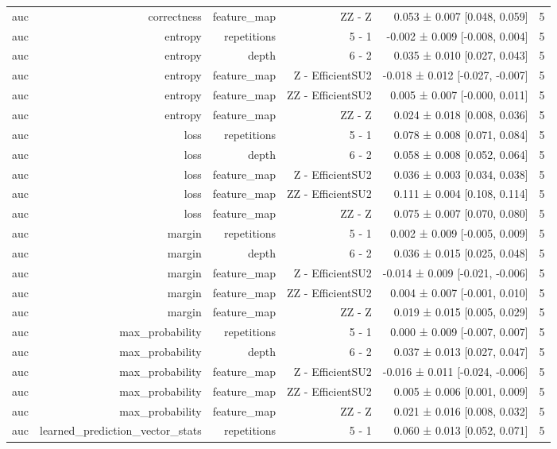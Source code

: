 \begin{table}
\begin{tabular}{lrrrrr}
auc & correctness & feature\_map & ZZ - Z & 0.053 ± 0.007 [0.048, 0.059] & 5 \\
auc & entropy & repetitions & 5 - 1 & -0.002 ± 0.009 [-0.008, 0.004] & 5 \\
auc & entropy & depth & 6 - 2 & 0.035 ± 0.010 [0.027, 0.043] & 5 \\
auc & entropy & feature\_map & Z - EfficientSU2 & -0.018 ± 0.012 [-0.027, -0.007] & 5 \\
auc & entropy & feature\_map & ZZ - EfficientSU2 & 0.005 ± 0.007 [-0.000, 0.011] & 5 \\
auc & entropy & feature\_map & ZZ - Z & 0.024 ± 0.018 [0.008, 0.036] & 5 \\
auc & loss & repetitions & 5 - 1 & 0.078 ± 0.008 [0.071, 0.084] & 5 \\
auc & loss & depth & 6 - 2 & 0.058 ± 0.008 [0.052, 0.064] & 5 \\
auc & loss & feature\_map & Z - EfficientSU2 & 0.036 ± 0.003 [0.034, 0.038] & 5 \\
auc & loss & feature\_map & ZZ - EfficientSU2 & 0.111 ± 0.004 [0.108, 0.114] & 5 \\
auc & loss & feature\_map & ZZ - Z & 0.075 ± 0.007 [0.070, 0.080] & 5 \\
auc & margin & repetitions & 5 - 1 & 0.002 ± 0.009 [-0.005, 0.009] & 5 \\
auc & margin & depth & 6 - 2 & 0.036 ± 0.015 [0.025, 0.048] & 5 \\
auc & margin & feature\_map & Z - EfficientSU2 & -0.014 ± 0.009 [-0.021, -0.006] & 5 \\
auc & margin & feature\_map & ZZ - EfficientSU2 & 0.004 ± 0.007 [-0.001, 0.010] & 5 \\
auc & margin & feature\_map & ZZ - Z & 0.019 ± 0.015 [0.005, 0.029] & 5 \\
auc & max\_probability & repetitions & 5 - 1 & 0.000 ± 0.009 [-0.007, 0.007] & 5 \\
auc & max\_probability & depth & 6 - 2 & 0.037 ± 0.013 [0.027, 0.047] & 5 \\
auc & max\_probability & feature\_map & Z - EfficientSU2 & -0.016 ± 0.011 [-0.024, -0.006] & 5 \\
auc & max\_probability & feature\_map & ZZ - EfficientSU2 & 0.005 ± 0.006 [0.001, 0.009] & 5 \\
auc & max\_probability & feature\_map & ZZ - Z & 0.021 ± 0.016 [0.008, 0.032] & 5 \\
auc & learned\_prediction\_vector\_stats & repetitions & 5 - 1 & 0.060 ± 0.013 [0.052, 0.071] & 5 \\

\end{tabular}
\end{table}
